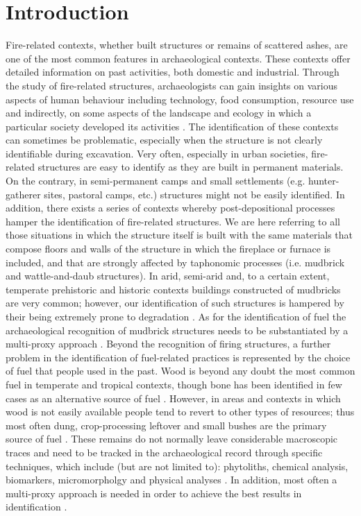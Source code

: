 \documentclass[authoryear,preprint,review,12pt]{elsarticle}
\begin{document}
\linenumbers

\section{Introduction}
\label{sec:1}
Fire-related contexts, whether built structures or remains of scattered ashes, are one of the most common features in archaeological contexts. These contexts offer detailed information on past activities, both domestic and industrial. Through the study of fire-related structures, archaeologists can gain insights on various aspects of human behaviour including technology, food consumption, resource use and indirectly, on some aspects of the landscape and ecology in which a particular society developed its activities \citep{Asouti2003,Meyer2003,Chabal1997,ShahackGross2004}. The identification of these contexts can sometimes be problematic, especially when the structure is not clearly identifiable during excavation. Very often, especially in urban societies, fire-related structures are easy to identify as they are built in permanent materials. On the contrary, in semi-permanent camps and small settlements (e.g. hunter-gatherer sites, pastoral camps, etc.) structures might not be easily identified. In addition, there exists a series of contexts whereby post-depositional processes hamper the identification of fire-related structures. We are here referring to all those situations in which the structure itself is built with the same materials that compose floors and walls of the structure in which the fireplace or furnace is included, and that are strongly affected by taphonomic processes (i.e. mudbrick and wattle-and-daub structures). In arid, semi-arid and, to a certain extent, temperate prehistoric and historic contexts buildings constructed of mudbricks are very common; however, our identification of such structures is hampered by their being extremely prone to degradation \citep{Friesem2014}. As for the identification of fuel the archaeological recognition of mudbrick structures needs to be substantiated by a multi-proxy approach \citep{Friesem2011}.
Beyond the recognition of firing structures, a further problem in the identification of fuel-related practices is represented by the choice of fuel that people used in the past. Wood is beyond any doubt the most common fuel in temperate and tropical contexts, though bone has been identified in few cases as an alternative source of fuel \citep{Beresford-jones2010,Thery-parisot2002}. However, in areas and contexts in which wood is not easily available people tend to revert to other types of resources; thus most often dung, crop-processing leftover and small bushes are the primary source of fuel \citep{Lancelotti2010,Penaa}. These remains do not normally leave considerable macroscopic traces and need to be tracked in the archaeological record through specific techniques, which include (but are not limited to): phytoliths, chemical analysis, biomarkers, micromorpholgy and physical analyses \citep{ShahackGross2011}. In addition, most often a multi-proxy approach is needed in order to achieve the best results in identification \citep{GurArieh2013,Lancelotti2012,Linseele2013}.
\end{document}
